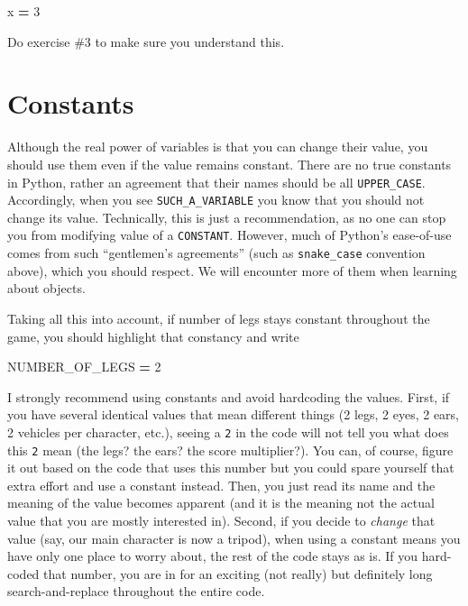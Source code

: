\documentclass[
]{book}
\newenvironment{Shaded}{\begin{snugshade}}{\end{snugshade}}
\newcommand{\DecValTok}[1]{\textcolor[rgb]{0.00,0.00,0.81}{#1}}
\newcommand{\NormalTok}[1]{#1}
\newcommand{\OperatorTok}[1]{\textcolor[rgb]{0.81,0.36,0.00}{\textbf{#1}}}
\begin{document}
\begin{Shaded}
\begin{Highlighting}[]
\NormalTok{x }\OperatorTok{=} \DecValTok{3}
\end{Highlighting}
\end{Shaded}

Do exercise \#3 to make sure you understand this.

\hypertarget{constants}{%
\section{Constants}\label{constants}}

Although the real power of variables is that you can change their value, you should use them even if the value remains constant. There are no true constants in Python, rather an agreement that their names should be all \texttt{UPPER\_CASE}. Accordingly, when you see \texttt{SUCH\_A\_VARIABLE} you know that you should not change its value. Technically, this is just a recommendation, as no one can stop you from modifying value of a \texttt{CONSTANT}. However, much of Python's ease-of-use comes from such ``gentlemen's agreements'' (such as \texttt{snake\_case} convention above), which you should respect. We will encounter more of them when learning about objects.

Taking all this into account, if number of legs stays constant throughout the game, you should highlight that constancy and write

\begin{Shaded}
\begin{Highlighting}[]
\NormalTok{NUMBER\_OF\_LEGS }\OperatorTok{=} \DecValTok{2}
\end{Highlighting}
\end{Shaded}

I strongly recommend using constants and avoid hardcoding the values. First, if you have several identical values that mean different things (2 legs, 2 eyes, 2 ears, 2 vehicles per character, etc.), seeing a \texttt{2} in the code will not tell you what does this \texttt{2} mean (the legs? the ears? the score multiplier?). You can, of course, figure it out based on the code that uses this number but you could spare yourself that extra effort and use a constant instead. Then, you just read its name and the meaning of the value becomes apparent (and it is the meaning not the actual value that you are mostly interested in). Second, if you decide to \emph{change} that value (say, our main character is now a tripod), when using a constant means you have only one place to worry about, the rest of the code stays as is. If you hard-coded that number, you are in for an exciting (not really) but definitely long search-and-replace throughout the entire code.
\end{document}
